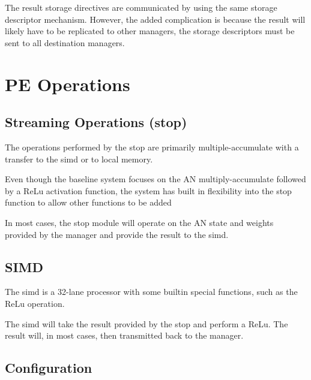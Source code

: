 The result storage directives are communicated by using the same storage descriptor mechanism. However, the added complication is because the result will likely have to be replicated to other managers, the storage descriptors must be sent to all destination managers.


\section{PE Operations}
\label{sec:PE Operations}

\subsection{Streaming Operations (\ac{stop})}
\label{sec:streamingOps}
The operations performed by the \ac{stop} are primarily multiple-accumulate with a transfer to the \ac{simd} or to local memory.

Even though the baseline system focuses on the AN multiply-accumulate followed by a ReLu activation function, the system has built in flexibility into the \ac{stop} function to allow other functions to be added

In most cases, the \ac{stop} module will operate on the AN state and weights provided by the manager and provide the result to the \ac{simd}.
\subsection{SIMD}
\label{sec:SIMD}

The \ac{simd} is a 32-lane processor with some builtin special functions, such as the ReLu operation.

The \ac{simd} will take the result provided by the \ac{stop} and perform a ReLu. The result will, in most cases, then transmitted back to the manager.

\subsection{Configuration}
\label{sec:peConfiguration}

